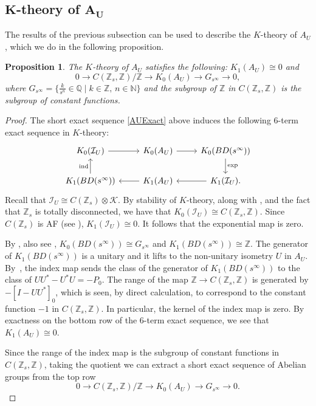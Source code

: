 \documentclass[pdftex]{sigma}
\newcommand{\N}{{\mathbb N}}
\newcommand{\Q}{{\mathbb Q}}
\newcommand{\Z}{{\mathbb Z}}
\numberwithin{equation}{section}
\newtheorem{Proposition}[Theorem]{Proposition}
 { \theoremstyle{definition}
\newtheorem{Definition}[Theorem]{Definition}
\newtheorem{Note}[Theorem]{Note}
\newtheorem{Example}[Theorem]{Example}
\newtheorem{Remark}[Theorem]{Remark} }
\begin{document}
\subsection[K-theory of A\_U]{$\boldsymbol{K}$-theory of $\boldsymbol{A_U}$}
The results of the previous subsection can be used to describe the $K$-theory of $A_U$, which we do in the following proposition.
\begin{Proposition}
The $K$-theory of $A_U$ satisfies the following: $K_1(A_U) \cong 0$ and
\begin{equation*}
0 \to C(\Z_s, \Z)/\Z \to K_0(A_U) \to G_{s^\infty} \to 0,
\end{equation*}
where $G_{s^\infty} = \bigl\{ \frac{k}{s^n} \in \Q \mid k \in \Z,\, n \in \N \bigr\}$ and the subgroup of $\Z$ in $C(\Z_s,\Z)$ is the subgroup of constant functions.
\end{Proposition}
\begin{proof}
The short exact sequence \eqref{AUExact} above induces the following $6$-term exact sequence in $K$-theory:
\begin{equation*}
\begin{tikzcd}
 K_0(\mathcal{I}_U) \arrow{r} & K_0(A_U) \arrow{r} & K_0(BD(s^\infty)) \arrow{d}{\textup{exp}} \\
 K_1(BD(s^\infty)) \arrow{u}{\textup{ind}} & K_1(A_U) \arrow{l} & K_1(\mathcal{I}_U) \arrow{l}.
\end{tikzcd}
\end{equation*}
Recall that $\mathcal{I}_U \cong C(\Z_s) \otimes \mathcal{K}$. By stability of $K$-theory, along with \cite[Exercise 3.4]{RLL}, and the fact that $\Z_s$ is totally disconnected, we have that
$
K_0(\mathcal{I}_U) \cong C(\Z_s,\Z)$.
Since $C(\Z_s)$ is AF (see \cite[Example III.2.5]{KD}),
$
K_1(\mathcal{I}_U) \cong 0$.
It follows that the exponential map is zero.

By \cite[Exercise 10.11.4\,(b)]{Blackadar}, also see \cite{KMP2},
$K_0(BD(s^\infty)) \cong G_{s^\infty}$ and $ K_1(BD(s^\infty)) \cong \Z$.
The generator of $K_1(BD(s^\infty))$ is a unitary and it lifts to the non-unitary isometry $U$ in $A_U$. By~\cite[Proposition~9.2.4]{RLL}, the index map sends the class of the generator of $K_1(BD(s^\infty))$ to the class of $UU^*-U^*U=-P_0$. The range of the map $\Z \to C(\Z_s , \Z)$ is generated by $-[I - UU^*]_0$, which is seen, by direct calculation, to correspond to the constant function $-1$ in $C(\Z_s, \Z)$. In particular, the kernel of the index map is zero. By exactness on the bottom row of the $6$-term exact sequence, we see that
$
K_1(A_U) \cong 0$.


Since the range of the index map is the subgroup of constant functions in $C(\Z_s, \Z)$, taking the quotient we can extract a short exact sequence of Abelian groups from the top row
\begin{equation*}
0 \to C(\Z_s, \Z)/\Z \to K_0(A_U) \to G_{s^\infty} \to 0.\tag*{\qed}
\end{equation*} \renewcommand{\qed}{}
\end{proof}
\end{document}
